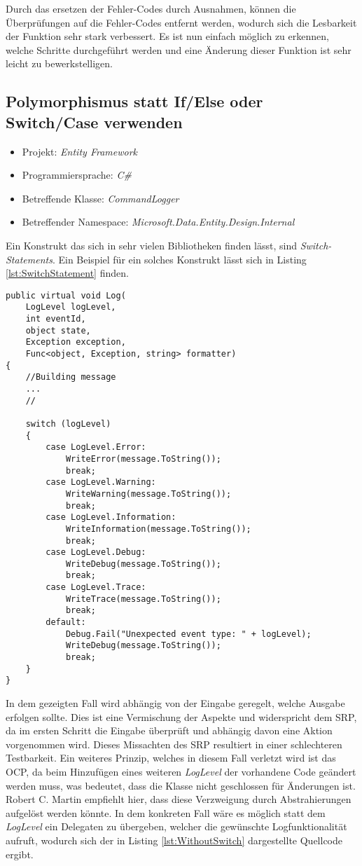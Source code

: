 \SuperPar Durch das ersetzen der Fehler-Codes durch Ausnahmen, können die Überprüfungen auf die Fehler-Codes entfernt werden, wodurch sich die Lesbarkeit der Funktion sehr stark verbessert. Es ist nun einfach möglich zu erkennen, welche Schritte durchgeführt werden und eine Änderung dieser Funktion ist sehr leicht zu bewerkstelligen. 

\subsection{Polymorphismus statt If/Else oder Switch/Case verwenden}
\begin{itemize}
	\item Projekt: \textit{Entity Framework}
	\item Programmiersprache: \textit{C\#}
	\item Betreffende Klasse: \textit{CommandLogger }
	\item Betreffender Namespace: \textit{Microsoft.Data.Entity.Design.Internal}
\end{itemize}
\SuperPar Ein Konstrukt das sich in sehr vielen Bibliotheken finden lässt, sind \textit{Switch-Statements}. Ein Beispiel für ein solches Konstrukt lässt sich in  Listing \ref{lst:SwitchStatement} finden.

\begin{lstlisting}[language={[Sharp]C}, caption=Beispiele für Switch Statement, label=lst:SwitchStatement]
public virtual void Log(
	LogLevel logLevel,
	int eventId,
	object state,
	Exception exception,
	Func<object, Exception, string> formatter)
{
	//Building message
	...
	//

	switch (logLevel)
	{
		case LogLevel.Error:
			WriteError(message.ToString());
			break;
		case LogLevel.Warning:
			WriteWarning(message.ToString());
			break;
		case LogLevel.Information:
			WriteInformation(message.ToString());
			break;
		case LogLevel.Debug:
			WriteDebug(message.ToString());
			break;
		case LogLevel.Trace:
			WriteTrace(message.ToString());
			break;
		default:
			Debug.Fail("Unexpected event type: " + logLevel);
			WriteDebug(message.ToString());
			break;
	}
}
\end{lstlisting}

\SuperPar In dem gezeigten Fall wird abhängig von der Eingabe geregelt, welche Ausgabe erfolgen sollte. Dies ist eine Vermischung der Aspekte und widerspricht dem SRP, da im ersten Schritt die Eingabe überprüft und abhängig davon eine Aktion vorgenommen wird. Dieses Missachten des SRP resultiert in einer schlechteren Testbarkeit. Ein weiteres Prinzip, welches in diesem Fall verletzt wird ist das OCP, da beim Hinzufügen eines weiteren \textit{LogLevel} der vorhandene Code geändert werden muss, was bedeutet, dass die Klasse nicht geschlossen für Änderungen ist. Robert C. Martin empfiehlt hier, dass diese Verzweigung durch Abstrahierungen aufgelöst werden könnte. In dem konkreten Fall wäre es möglich statt dem \textit{LogLevel} ein Delegaten zu übergeben, welcher die gewünschte Logfunktionalität aufruft, wodurch sich der in Listing \ref{lst:WithoutSwitch} dargestellte Quellcode ergibt.

